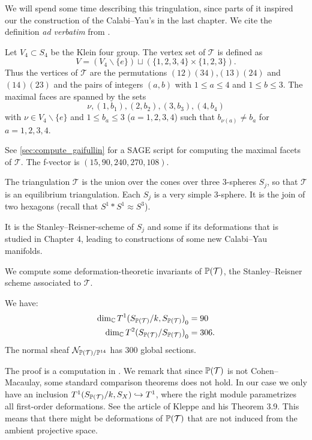 We will spend some time describing this tringulation, since parts of it inspired our the construction of the Calabi--Yau's in the last chapter. We cite the definition \emph{ad verbatim} from \cite{cp2_15_chess}. 

 \begin{definition}
 Let $V_4 \subset S_4$ be the Klein four group. The vertex set of $\mathcal T$ is defined as
\[
 V = (V_4 \backslash \{e \}) \sqcup \left( \{1,2,3,4 \} \times \{ 1,2,3 \} \right).
\]
 Thus the vertices of $\mathcal T$ are the permutations $(12)(34)$,$(13)(24)$ and $(14)(23)$ and the pairs of integers $(a,b)$ with $1 \leq a \leq 4$ and $1 \leq b \leq 3$. The maximal faces are spanned by the sets 
\[
 \nu, (1,b_1), (2,b_2), (3,b_3), (4,b_4)
\]
 with $\nu \in V_4 \backslash \{ e \}$ and $1 \leq b_a \leq 3$ ($a=1,2,3,4$) such that $b_{\nu(a)} \neq b_a$ for $a=1,2,3,4$.
 \end{definition}

See \cref{sec:compute_gaifullin} for a SAGE \cite{sagemath} script for computing the maximal facets of $\mathcal T$. The f-vector is $(15,90,240,270,108)$.

The triangulation $\mathcal T$ is the union over the cones over three $3$-spheres $S_j$, so that $\mathcal T$ is an equilibrium triangulation. Each $S_j$ is a very simple $3$-sphere. It is the join of two hexagons (recall that $S^1 \ast S^1 \approx S^3$).

\begin{remark}
  It is the Stanley--Reisner-scheme of $S_j$ and some if its
  deformations that is studied in Chapter 4, leading to constructions
  of some new Calabi--Yau manifolds.
\end{remark}

We compute some deformation-theoretic invariants of $\P(\mathcal T)$, the Stanley--Reisner scheme associated to $\mathcal T$.

\begin{proposition}
We have: 
  \begin{eqnarray*}
    \label{eq:t1dims_triang}
\dim_\C  {T^1(S_{\P(\mathcal T)}/k, S_{\P(\mathcal T)})}_0&= 90 \\ 
\dim_\C {T^2(S_{\P(\mathcal T)}/S_{\P(\mathcal T)})}_0 &= 306.
  \end{eqnarray*}
The normal sheaf $\mathcal N_{\P(\mathcal T)/\P^{14}}$ has $300$ global sections.
\end{proposition}

The proof is a computation in \MM. We remark that since $\P(\mathcal T)$ is not Cohen--Macaulay, some standard comparison theorems does not hold. In our case we only have an inclusion $T^1(S_{\P(\mathcal T)}/k,S_X) \hookrightarrow T^1$, where the right module parametrizes all first-order deformations. See the article of Kleppe \cite{kleppe_deformations} and his Theorem 3.9. This means that there might be deformations of $\P(\mathcal T)$ that are not induced from the ambient projective space.

